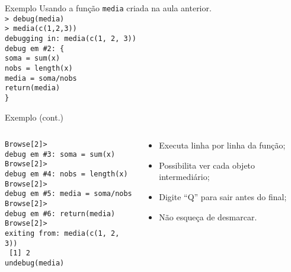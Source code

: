 \documentclass[handout]{beamer}
\begin{document}
  \begin{frame}{Exemplo}
Usando a função \texttt{media} criada na aula anterior.\\
\texttt{> debug(media)\\
> media(c(1,2,3))\\
debugging in: media(c(1, 2, 3))\\
debug em \#2: \{\\
    soma = sum(x)\\
    nobs = length(x)\\
    media = soma/nobs\\
    return(media)\\
\}\\}
\end{frame}
\begin{frame}{Exemplo (cont.)}
  \begin{columns}
    \begin{column}{6cm}
      \texttt{Browse[2]> \\
        debug em \#3: soma = sum(x)\\
        Browse[2]> \\
        debug em \#4: nobs = length(x)\\
        Browse[2]> \\
        debug em \#5: media = soma/nobs\\
        Browse[2]> \\
        debug em \#6: return(media)\\
        Browse[2]> \\
        exiting from: media(c(1, 2, 3))\\
        ~[1] 2\\
        undebug(media)}
    \end{column}
    \begin{column}{6cm}
\pause
\begin{itemize}
\item Executa linha por linha da função;
\item Possibilita ver cada objeto intermediário;
\item Digite ``Q'' para sair antes do final;
\item Não esqueça de desmarcar.
\end{itemize}
   \end{column}
  \end{columns}
  \end{frame}
\end{document}
